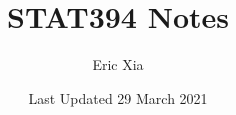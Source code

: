 \documentclass{article}
\title{STAT394 Notes}
\author{Eric Xia}
\date{Last Updated 29 March 2021}
\begin{document}
    \maketitle
    \tableofcontents
    \pagebreak

\end{document}
